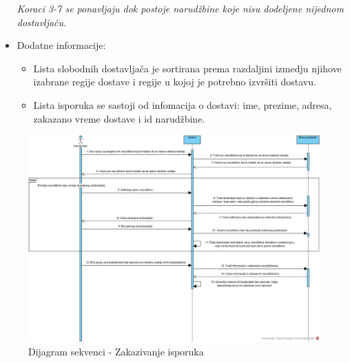 \begin{itemize}
\begin{enumerate}
		\end{enumerate}
	  \textit{Koraci 3-7 se ponavljaju dok postoje narudžbine koje nisu dodeljene nijednom dostavljaču.}
   \item Dodatne informacije:
        \begin{itemize}
           \item Lista slobodnih dostavljača je sortirana prema razdaljini izmedju njihove izabrane regije dostave i regije u kojoj je potrebno izvršiti dostavu.
            \item Lista isporuka se sastoji od infomacija o dostavi: ime, prezime, adresa, zakazano vreme dostave i id narudžbine. 
        \end{itemize}
\end{itemize}

\begin{figure}[H]
\begin{center}
\includegraphics[width=\textwidth]{Pictures/sequence_scheduling_deliveries.jpg}
\end{center}
    \caption{Dijagram sekvenci - Zakazivanje isporuka}
\label{fig:Sequence_diagram_scheduling_deliveries}
\end{figure}

